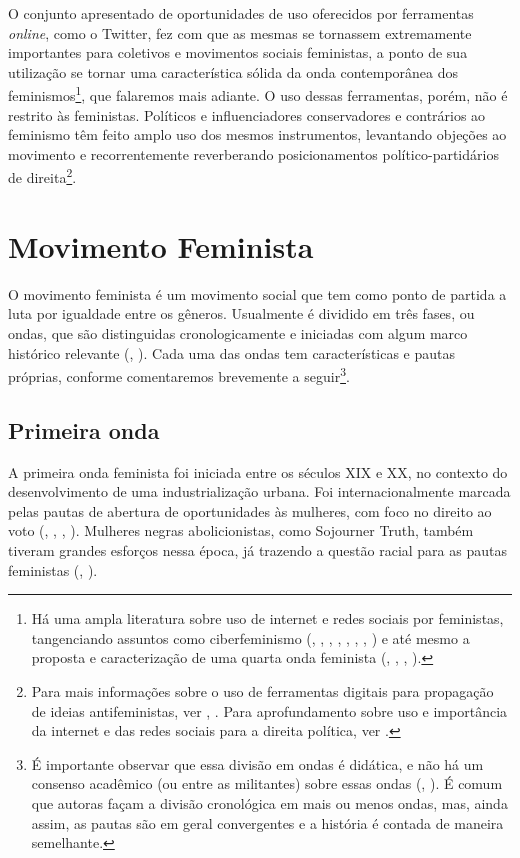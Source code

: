\documentclass[
	12pt,				%
	openright,			%
	twoside,			%
	a4paper,			%
	english,			%
	brazil				%
	]{abntex2}
\begin{document}
 O conjunto apresentado de oportunidades de uso oferecidos por ferramentas \textit{online}, como o Twitter, fez com que as mesmas se tornassem extremamente importantes para coletivos e movimentos sociais feministas, a ponto de sua utilização se tornar uma característica sólida da onda contemporânea dos feminismos\footnote{Há uma ampla literatura sobre uso de internet e redes sociais por feministas, tangenciando assuntos como ciberfeminismo (, \citeyear{haraway2000}, , \citeyear{coelho2018}, , \citeyear{martinez2019}, , \citeyear{gohn2016}) e até mesmo a proposta e caracterização de uma quarta onda feminista (, \citeyear{araujo2018}, , \citeyear{perez2019}).}, que falaremos mais adiante. O uso dessas ferramentas, porém, não é restrito às feministas. Políticos e influenciadores conservadores e contrários ao feminismo têm feito amplo uso dos mesmos instrumentos, levantando objeções ao movimento e recorrentemente reverberando posicionamentos político-partidários de direita\footnote{Para mais informações sobre o uso de ferramentas digitais para propagação de ideias antifeministas, ver , \citeyear{almeida2019}. Para aprofundamento sobre uso e importância da internet e das redes sociais para a direita política, ver .}.

 \section{Movimento Feminista}
 O movimento feminista é um movimento social que tem como ponto de partida a luta por igualdade entre os gêneros. Usualmente é dividido em três fases, ou ondas, que são distinguidas cronologicamente e iniciadas com algum marco histórico relevante (, \citeyear{sousa2018}). Cada uma das ondas tem características e pautas próprias, conforme comentaremos brevemente a seguir\footnote{É importante observar que essa divisão em ondas é didática, e não há um consenso acadêmico (ou entre as militantes) sobre essas ondas (, \citeyear{rampton2008}). É comum que autoras façam a divisão cronológica em mais ou menos ondas, mas, ainda assim, as pautas são em geral convergentes e a história é contada de maneira semelhante.}.
 
 \subsection{Primeira onda}
 A primeira onda feminista foi iniciada entre os séculos XIX e XX, no contexto do desenvolvimento de uma industrialização urbana. Foi internacionalmente marcada pelas pautas de abertura de oportunidades às mulheres, com foco no direito ao voto (, \citeyear{rampton2008}, , \citeyear{sousa2018}). Mulheres negras abolicionistas, como Sojourner Truth, também tiveram grandes esforços nessa época, já trazendo a questão racial para as pautas feministas (, \citeyear{rampton2008}).
\end{document}
